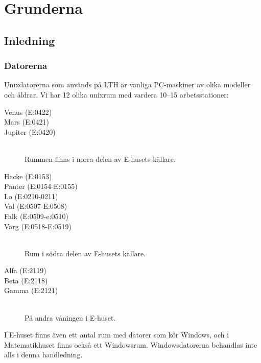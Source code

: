 \documentclass[a4paper,twocolumn]{book}
\begin{document}
\mainmatter

\chapter{Grunderna}
\label{cha:grunderna}



\section{Inledning}


\subsection{Datorerna}

Unixdatorerna som används på LTH är vanliga PC-maskiner av olika
modeller och åldrar. Vi har 12 olika unixrum med
vardera 10--15 arbetsstationer:
\begin{description}
\item[Venus (E:0422)] 
\item[Mars (E:0421)]
\item[Jupiter (E:0420)] \mbox{}\\
  Rummen finns i norra delen av E-husets källare. 
\item[Hacke (E:0153)]
\item[Panter (E:0154-E:0155)] 
\item[Lo (E:0210-0211)]
\item[Val (E:0507-E:0508)]
\item[Falk (E:0509-e:0510)]
\item[Varg (E:0518-E:0519)] \mbox{}\\
  Rum i södra delen av E-husets källare.
\item[Alfa (E:2119)] 
\item[Beta (E:2118)] 
\item[Gamma (E:2121)] \mbox{}\\
  På andra våningen i E-huset.
\end{description}

I E-huset finns även ett antal rum med datorer som kör Windows, och i
Matematikhuset finns också ett Windowsrum.
Windowsdatorerna behandlas inte alls i denna handledning.
\end{document}
